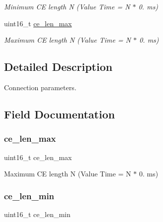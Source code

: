\begin{DoxyCompactItemize}
\begin{DoxyCompactList}\small\item\em Minimum CE length N (Value Time = N $\ast$ 0. ms) \end{DoxyCompactList}\item 
uint16\+\_\+t \mbox{\hyperlink{structat__ble__connection__params__t_a656652179ea805e26b65a81d2675fe6b}{ce\+\_\+len\+\_\+max}}
\begin{DoxyCompactList}\small\item\em Maximum CE length N (Value Time = N $\ast$ 0. ms) \end{DoxyCompactList}\end{DoxyCompactItemize}


\subsection{Detailed Description}
Connection parameters. 

\subsection{Field Documentation}
\mbox{\label{structat__ble__connection__params__t_a656652179ea805e26b65a81d2675fe6b}} 
\subsubsection{\texorpdfstring{ce\_len\_max}{ce\_len\_max}}
{\footnotesize\ttfamily uint16\+\_\+t ce\+\_\+len\+\_\+max}



Maximum CE length N (Value Time = N $\ast$ 0. ms) 

\mbox{\label{structat__ble__connection__params__t_ac2329d8a3be3b5f4ecb8ce47131ea377}} 
\subsubsection{\texorpdfstring{ce\_len\_min}{ce\_len\_min}}
{\footnotesize\ttfamily uint16\+\_\+t ce\+\_\+len\+\_\+min}



